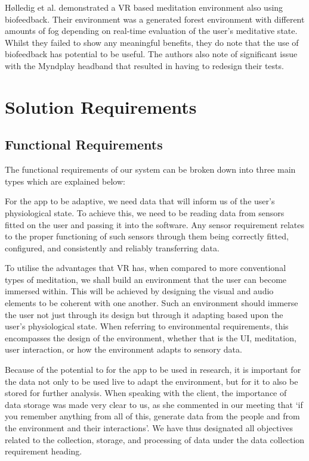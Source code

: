\documentclass[coverpage,lineno]{../custom}
\begin{document}
Hølledig et al. \cite{holledig_zenvr_2018} demonstrated a VR based meditation environment also using biofeedback. Their environment was a generated forest environment with different amounts of fog depending on real-time evaluation of the user's meditative state. Whilst they failed to show any meaningful benefits, they do note that the use of biofeedback has potential to be useful. The authors also note of significant issue with the Myndplay headband that resulted in having to redesign their tests.

\newpage
\section{Solution Requirements}
\label{sec:req}

\subsection{Functional Requirements}
\label{ssec:f_req}

The functional requirements of our system can be broken down into three main types which are explained below:

\begin{description}[font=\bfseries, leftmargin=1cm, style=nextline]
\item[Sensor]
For the app to be adaptive, we need data that will inform us of the user’s physiological state. To achieve this, we need to be reading data from sensors fitted on the user and passing it into the software. Any sensor requirement relates to the proper functioning of such sensors through them being correctly fitted, configured, and consistently and reliably transferring data.
\item[Environmental]
To utilise the advantages that VR has, when compared to more conventional types of meditation, we shall build an environment that the user can become immersed within. This will be achieved by designing the visual and audio elements to be coherent with one another. Such an environment should immerse the user not just through its design but through it adapting based upon the user’s physiological state. When referring to environmental requirements, this encompasses the design of the environment, whether that is the UI, meditation, user interaction, or how the environment adapts to sensory data.
\item[Data Collection]
Because of the potential to for the app to be used in research, it is important for the data not only to be used live to adapt the environment, but for it to also be stored for further analysis. When speaking with the client, the importance of data storage was made very clear to us, as she commented in our meeting that `if you remember anything from all of this, generate data from the people and from the environment and their interactions'.
We have thus designated all objectives related to the collection, storage, and processing of data under the data collection requirement heading.
\end{description}
\end{document}
